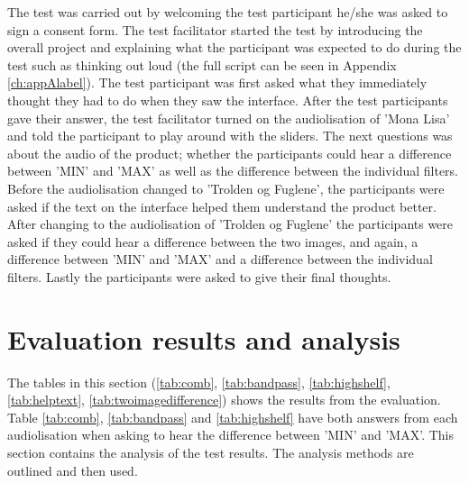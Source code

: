 The test was carried out by welcoming the test participant he/she was asked to sign a consent form. The test facilitator started the test by introducing the overall project and explaining what the participant was expected to do during the test such as thinking out loud (the full script can be seen in Appendix \ref{ch:appAlabel}). The test participant was first asked what they immediately thought they had to do when they saw the interface. After the test participants gave their answer, the test facilitator turned on the audiolisation of 'Mona Lisa' and told the participant to play around with the sliders. The next questions was about the audio of the product; whether the participants could hear a difference between 'MIN' and 'MAX' as well as the difference between the individual filters. Before the audiolisation changed to 'Trolden og Fuglene', the participants were asked if the text on the interface helped them understand the product better. 
After changing to the audiolisation of 'Trolden og Fuglene' the participants were asked if they could hear a difference between the two images, and again, a difference between 'MIN' and 'MAX' and a difference between the individual filters. Lastly the participants were asked to give their final thoughts.

\section{Evaluation results and analysis}
The tables in this section (\ref{tab:comb}, \ref{tab:bandpass}, \ref{tab:highshelf}, \ref{tab:helptext}, \ref{tab:twoimagedifference}) shows the results from the evaluation. Table \ref{tab:comb}, \ref{tab:bandpass} and \ref{tab:highshelf} have both answers from each audiolisation when asking to hear the difference between 'MIN' and 'MAX'. This section contains the analysis of the test results. The analysis methods are outlined and then used. 

